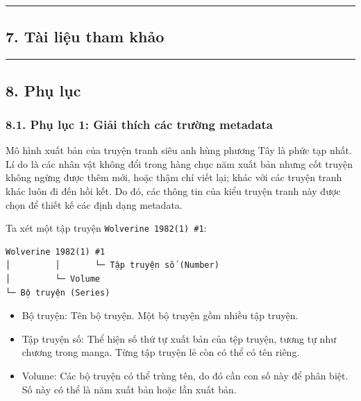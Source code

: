\documentclass[
]{article}
\providecommand{\tightlist}{%
  \setlength{\itemsep}{0pt}\setlength{\parskip}{0pt}}
\begin{document}
\begin{center}\rule{0.5\linewidth}{0.5pt}\end{center}

\hypertarget{tuxe0i-liux1ec7u-tham-khux1ea3o}{%
\subsection{\texorpdfstring{7. Tài liệu tham khảo
}{7. Tài liệu tham khảo }}\label{tuxe0i-liux1ec7u-tham-khux1ea3o}}

\begin{center}\rule{0.5\linewidth}{0.5pt}\end{center}

\hypertarget{phux1ee5-lux1ee5c}{%
\subsection{\texorpdfstring{8. Phụ lục
}{8. Phụ lục }}\label{phux1ee5-lux1ee5c}}

\hypertarget{phux1ee5-lux1ee5c-1-giux1ea3i-thuxedch-cuxe1c-trux1b0ux1eddng-metadata}{%
\subsubsection{\texorpdfstring{8.1. Phụ lục 1: Giải thích các trường
metadata
}{8.1. Phụ lục 1: Giải thích các trường metadata }}\label{phux1ee5-lux1ee5c-1-giux1ea3i-thuxedch-cuxe1c-trux1b0ux1eddng-metadata}}

Mô hình xuất bản của truyện tranh siêu anh hùng phương Tây là phức tạp
nhất. Lí do là các nhân vật không đổi trong hàng chục năm xuất bản nhưng
cốt truyện không ngừng được thêm mới, hoặc thậm chí viết lại; khác với
các truyện tranh khác luôn đi đến hồi kết. Do đó, các thông tin của kiểu
truyện tranh này được chọn để thiết kế các định dạng metadata.

Ta xét một tập truyện \texttt{Wolverine\ 1982(1)\ \#1}:

\begin{verbatim}
Wolverine 1982(1) #1
│         │       └─ Tập truyện số (Number)
│         └─ Volume
└─ Bộ truyện (Series)
\end{verbatim}

\begin{itemize}
\tightlist
\item
  Bộ truyện: Tên bộ truyện. Một bộ truyện gồm nhiều tập truyện.
\item
  Tập truyện số: Thể hiện số thứ tự xuất bản của tệp truyện, tương tự
  như chương trong manga. Từng tập truyện lẻ còn có thể có tên riêng.
\item
  Volume: Các bộ truyện có thể trùng tên, do đó cần con số này để phân
  biệt. Số này có thể là năm xuất bản hoặc lần xuất bản.
\end{itemize}
\end{document}
